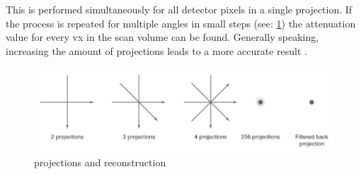 This is performed simultaneously for all detector pixels in a single projection.
If the process is repeated for multiple angles in small steps (see: \cref{fig:ct-projections}) the attenuation value for every \gls{vx} in the scan volume can be found.
Generally speaking, increasing the amount of projections leads to a more accurate result \cite{liMicrocomputedTomographySmall2008,orhanMicrocomputedTomographyMicroCT2020}.
\begin{figure}[h]
	\centerline{
		\includegraphics[scale=0.5]{images/ct-projections.png}}
	\caption{\mct\space projections and reconstruction\cite{orhanMicrocomputedTomographyMicroCT2020}}
	\label{fig:ct-projections}
\end{figure}

